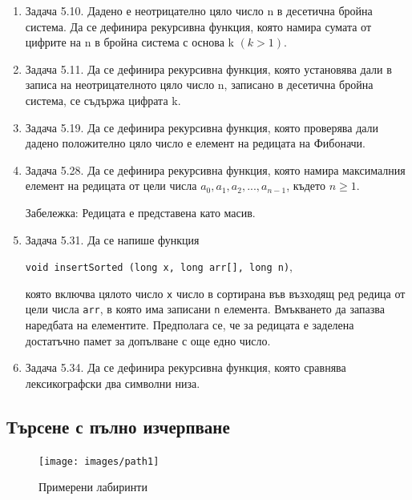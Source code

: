 {\begin{enumerate}
	\item Задача 5.10.\cite{sbornik} Дадено е неотрицателно цяло число n в десетична бройна система. Да се дефинира рекурсивна функция, която намира сумата от цифрите на n в бройна система с основа k $(k > 1)$.

	\item Задача 5.11.\cite{sbornik} Да се дефинира рекурсивна функция, която установява дали в записа на неотрицателното цяло число n, записано в десетична бройна система, се съдържа цифрата k.

	\item Задача 5.19.\cite{sbornik} Да се дефинира рекурсивна функция, която проверява дали дадено положително цяло число е елемент на редицата на Фибоначи.

	\item Задача 5.28.\cite{sbornik} Да се дефинира рекурсивна функция, която намира максималния елемент на редицата от цели числа $a_0, a_1, a_2, ..., a_{n-1}$, където $n \ge 1$.

	Забележка: Редицата е представена като масив.

	\item Задача 5.31.\cite{sbornik} Да се напише функция

	\texttt{void insertSorted (long x, long arr[], long n)},

	която включва цялото число \texttt{x} число в сортирана във възходящ ред редица от цели числа \texttt{arr}, в която има записани \texttt{n} елемента. Вмъкването да запазва наредбата на елементите. Предполага се, че за редицата е заделена достатъчно памет за допълване с още едно число.

	\item Задача 5.34.\cite{sbornik} Да се дефинира рекурсивна функция, която сравнява лексикографски два символни низа.
\end{enumerate}

\subsection{Търсене с пълно изчерпване}


\begin{figure}
\texttt{[image: images/path1]}
\vspace{-200px}
\caption{Примерени лабиринти}
\label{fig:samplelab}
\end{figure}


\begin{enumerate}[resume]


\end{enumerate}}
